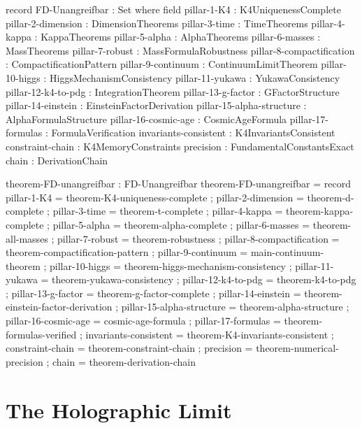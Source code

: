 \documentclass[11pt,a4paper]{book}
\begin{document}
\begin{code}
record FD-Unangreifbar : Set where
  field
    pillar-1-K4       : K4UniquenessComplete
    pillar-2-dimension : DimensionTheorems
    pillar-3-time     : TimeTheorems
    pillar-4-kappa    : KappaTheorems
    pillar-5-alpha    : AlphaTheorems
    pillar-6-masses   : MassTheorems
    pillar-7-robust   : MassFormulaRobustness
    pillar-8-compactification : CompactificationPattern
    pillar-9-continuum : ContinuumLimitTheorem
    pillar-10-higgs : HiggsMechanismConsistency
    pillar-11-yukawa : YukawaConsistency
    pillar-12-k4-to-pdg : IntegrationTheorem
    pillar-13-g-factor : GFactorStructure
    pillar-14-einstein : EinsteinFactorDerivation
    pillar-15-alpha-structure : AlphaFormulaStructure
    pillar-16-cosmic-age : CosmicAgeFormula
    pillar-17-formulas : FormulaVerification
    invariants-consistent : K4InvariantsConsistent
    constraint-chain  : K4MemoryConstraints
    precision         : FundamentalConstantsExact
    chain             : DerivationChain

theorem-FD-unangreifbar : FD-Unangreifbar
theorem-FD-unangreifbar = record
  { pillar-1-K4          = theorem-K4-uniqueness-complete
  ; pillar-2-dimension   = theorem-d-complete
  ; pillar-3-time        = theorem-t-complete
  ; pillar-4-kappa       = theorem-kappa-complete
  ; pillar-5-alpha       = theorem-alpha-complete
  ; pillar-6-masses      = theorem-all-masses
  ; pillar-7-robust      = theorem-robustness
  ; pillar-8-compactification = theorem-compactification-pattern
  ; pillar-9-continuum   = main-continuum-theorem
  ; pillar-10-higgs      = theorem-higgs-mechanism-consistency
  ; pillar-11-yukawa     = theorem-yukawa-consistency
  ; pillar-12-k4-to-pdg  = theorem-k4-to-pdg
  ; pillar-13-g-factor   = theorem-g-factor-complete
  ; pillar-14-einstein   = theorem-einstein-factor-derivation
  ; pillar-15-alpha-structure = theorem-alpha-structure
  ; pillar-16-cosmic-age = cosmic-age-formula
  ; pillar-17-formulas   = theorem-formulas-verified
  ; invariants-consistent = theorem-K4-invariants-consistent
  ; constraint-chain     = theorem-constraint-chain
  ; precision            = theorem-numerical-precision
  ; chain                = theorem-derivation-chain
  }
\end{code}

\section{The Holographic Limit}
\label{sec:holographic-limit}
\end{document}
